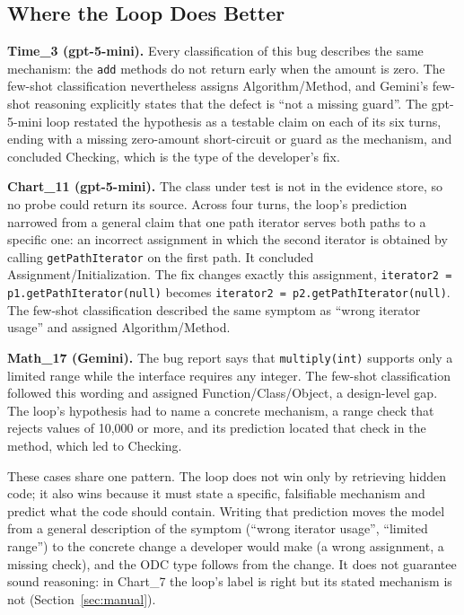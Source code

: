 \documentclass{iutbscthesis}
\begin{document}
\subsection{Where the Loop Does Better}

\textbf{Time\_3 (gpt-5-mini).} Every classification of this bug describes the same mechanism: the \texttt{add} methods do not return early when the amount is zero. The few-shot classification nevertheless assigns Algorithm/\allowbreak Method, and Gemini's few-shot reasoning explicitly states that the defect is ``not a missing guard''. The gpt-5-mini loop restated the hypothesis as a testable claim on each of its six turns, ending with a missing zero-amount short-circuit or guard as the mechanism, and concluded Checking, which is the type of the developer's fix.

\textbf{Chart\_11 (gpt-5-mini).} The class under test is not in the evidence store, so no probe could return its source. Across four turns, the loop's prediction narrowed from a general claim that one path iterator serves both paths to a specific one: an incorrect assignment in which the second iterator is obtained by calling \texttt{getPathIterator} on the first path. It concluded Assignment/\allowbreak Initialization. The fix changes exactly this assignment, \texttt{iterator2 = p1.\allowbreak getPathIterator(null)} becomes \texttt{iterator2 = p2.\allowbreak getPathIterator(null)}. The few-shot classification described the same symptom as ``wrong iterator usage'' and assigned Algorithm/\allowbreak Method.

\textbf{Math\_17 (Gemini).} The bug report says that \texttt{multiply(int)} supports only a limited range while the interface requires any integer. The few-shot classification followed this wording and assigned Function/\allowbreak Class/\allowbreak Object, a design-level gap. The loop's hypothesis had to name a concrete mechanism, a range check that rejects values of 10{,}000 or more, and its prediction located that check in the method, which led to Checking.

These cases share one pattern. The loop does not win only by retrieving hidden code; it also wins because it must state a specific, falsifiable mechanism and predict what the code should contain. Writing that prediction moves the model from a general description of the symptom (``wrong iterator usage'', ``limited range'') to the concrete change a developer would make (a wrong assignment, a missing check), and the ODC type follows from the change. It does not guarantee sound reasoning: in Chart\_7 the loop's label is right but its stated mechanism is not (Section~\ref{sec:manual}).
\end{document}
